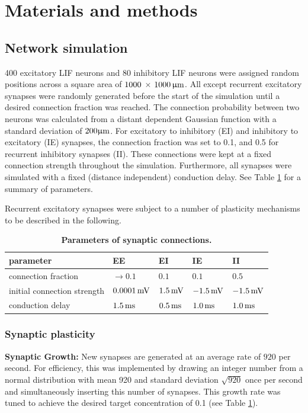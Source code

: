 \documentclass[10pt,letterpaper]{article}
\begin{document}
\section*{Materials and methods}
\subsection*{Network simulation} \label{network simulation}

400 excitatory LIF neurons and 80 inhibitory LIF neurons were assigned random positions across a square area of $\rm 1000$ $\times$  $1000 \, \rm \upmu m$. All except recurrent excitatory synapses were randomly generated before the start of the simulation until a desired connection fraction was reached. The connection probability between two neurons was calculated from a distant dependent Gaussian function with a standard deviation of $\rm 200 \upmu m$. For excitatory to inhibitory (EI) and inhibitory to excitatory (IE) synapses, the connection fraction was set to 0.1, and 0.5 for recurrent inhibitory synapses (II). These connections were kept at a fixed connection strength throughout the simulation. Furthermore, all synapses were simulated with a fixed (distance independent) conduction delay. See Table \ref{syn_conn_params} for a summary of parameters.

Recurrent excitatory synapses were subject to a number of plasticity mechanisms to be described in the following. 

\begin{table}
\caption{\bf Parameters of synaptic connections.}
\begin{tabular}{|l|l|l|l|l|}
\hline
\textbf{parameter} & \textbf{EE} & \textbf{EI} & \textbf{IE} & \textbf{II} \\ \hline
connection fraction & $\rightarrow 0.1$ & $0.1$ & $0.1$ & $0.5$ \\ \hline
initial connection strength & $\rm 0.0001\, mV$ & $\rm 1.5\, mV$ & $\rm -1.5\, mV$ & $\rm -1.5\, mV$ \\ \hline
conduction delay & $\rm 1.5\, ms$ & $\rm 0.5\, ms$ & $\rm 1.0\, ms$ & $\rm 1.0\, ms$ \\
\hline
\end{tabular}
\label{syn_conn_params}
\end{table}
\newpage
\subsubsection*{Synaptic plasticity}\label{Section_Methods_Syn_Plast}
\textbf{Synaptic Growth:} New synapses are generated at an average rate of $920$ per second. For efficiency, this was implemented by drawing an integer number from a normal distribution with mean 920 and standard deviation $\sqrt{920}$ once per second and simultaneously inserting this number of synapses. This growth rate was tuned to achieve the desired target concentration of 0.1 (see Table \ref{syn_conn_params}).
\end{document}
